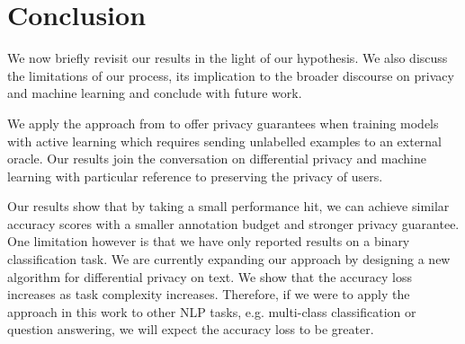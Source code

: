 \documentclass[letterpaper]{article}
\begin{document}


    
\section{Conclusion}
We now briefly revisit our results in the light of our hypothesis. We also discuss the limitations of our process, its implication to the broader discourse on privacy and machine learning and conclude with future work.

We apply the approach from \cite{li2012sampling} to offer privacy guarantees when training models with active learning which requires sending unlabelled examples to an external oracle. Our results join the conversation on differential privacy and machine learning \cite{ji2014differential} with particular reference to preserving the privacy of users.

Our results show that by taking a small performance hit, we can achieve similar accuracy scores with a smaller annotation budget and stronger privacy guarantee. One limitation however is that we have only reported results on a binary classification task. We are currently expanding our approach by designing a new algorithm for differential privacy on text. We show that the accuracy loss increases as task complexity increases. Therefore, if we were to apply the approach in this work to other NLP tasks, e.g. multi-class classification or question answering, we will expect the accuracy loss to be greater.
\end{document}
